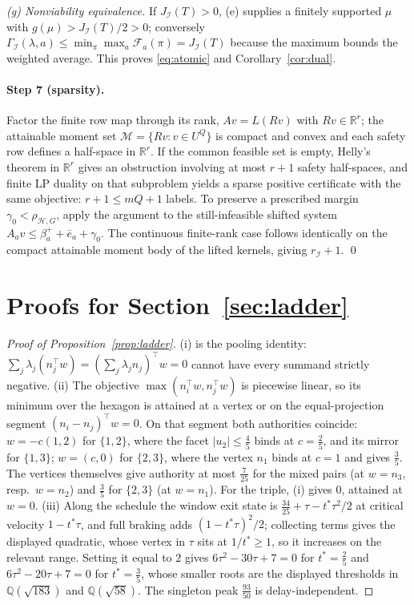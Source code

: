 \documentclass[11pt,a4paper]{article}
\theoremstyle{plain}
\theoremstyle{definition}
\theoremstyle{remark}
\newcommand{\R}{\mathbb{R}}
\newcommand{\calI}{\mathcal{I}}
\newcommand{\calH}{\mathcal{H}}
\newcommand{\calF}{\mathcal{F}}
\newcommand{\calM}{\mathcal{M}}
\newcommand{\J}{J_{\calI}(T)}
\newcommand{\Gam}{\Gamma_{\calI}}
\newcommand{\rhoHG}{\rho_{\calH,G}}
\newcommand{\ebar}{\bar{e}}
\newcommand{\tfr}[2]{\tfrac{#1}{#2}}
\begin{document}
\emph{(g) Nonviability equivalence.} If $\J>0$, (e) supplies a finitely supported $\mu$ with $g(\mu)>\J/2>0$; conversely $\Gam(\lambda,a)\le\min_\pi\max_a\calF_a(\pi)=\J$ because the maximum bounds the weighted average. This proves \eqref{eq:atomic} and Corollary~\ref{cor:dual}.

\paragraph{Step 7 (sparsity).}
Factor the finite row map through its rank, $Av=L(Rv)$ with $Rv\in\R^r$; the attainable moment set $\calM=\{Rv:v\in U^Q\}$ is compact and convex and each safety row defines a half-space in $\R^r$. If the common feasible set is empty, Helly's theorem in $\R^r$ gives an obstruction involving at most $r+1$ safety half-spaces, and finite LP duality on that subproblem \cite{Chvatal1983} yields a sparse positive certificate with the same objective: $r+1\le mQ+1$ labels. To preserve a prescribed margin $\gamma_0<\rhoHG$, apply the argument to the still-infeasible shifted system $A_av\le\beta^+_a+\ebar_a+\gamma_0$. The continuous finite-rank case follows identically on the compact attainable moment body of the lifted kernels, giving $r_\calI+1$. \qed

\section{Proofs for Section~\ref{sec:ladder}}\label{app:ladder}

\begin{proof}[Proof of Proposition~\ref{prop:ladder}]
(i) is the pooling identity: $\sum_j\lambda_j(n_j^\top w)=(\sum_j\lambda_jn_j)^\top w=0$ cannot have every summand strictly negative. (ii) The objective $\max(n_i^\top w,n_j^\top w)$ is piecewise linear, so its minimum over the hexagon is attained at a vertex or on the equal-projection segment $(n_i-n_j)^\top w=0$. On that segment both authorities coincide: $w=-c(1,2)$ for $\{1,2\}$, where the facet $|u_2|\le\tfr45$ binds at $c=\tfr25$, and its mirror for $\{1,3\}$; $w=(c,0)$ for $\{2,3\}$, where the vertex $n_1$ binds at $c=1$ and gives $\tfr35$. The vertices themselves give authority at most $\tfr7{25}$ for the mixed pairs (at $w=n_3$, resp.\ $w=n_2$) and $\tfr35$ for $\{2,3\}$ (at $w=n_1$). For the triple, (i) gives $0$, attained at $w=0$. (iii) Along the schedule the window exit state is $\tfr{34}{25}+\tau-t^\ast\tau^2/2$ at critical velocity $1-t^\ast\tau$, and full braking adds $(1-t^\ast\tau)^2/2$; collecting terms gives the displayed quadratic, whose vertex in $\tau$ sits at $1/t^\ast\ge1$, so it increases on the relevant range. Setting it equal to $2$ gives $6\tau^2-30\tau+7=0$ for $t^\ast=\tfr25$ and $6\tau^2-20\tau+7=0$ for $t^\ast=\tfr35$, whose smaller roots are the displayed thresholds in $\mathbb Q(\sqrt{183})$ and $\mathbb Q(\sqrt{58})$. The singleton peak $\tfr{93}{50}$ is delay-independent.
\end{proof}
\end{document}
